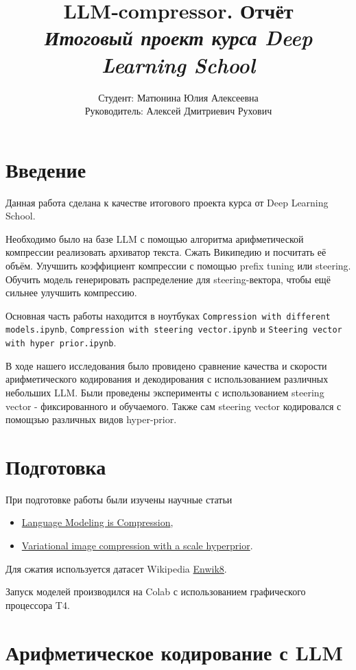 \documentclass[a4paper,11pt]{article}
\title{%
  LLM‑compressor. Отчёт\\[0.5ex]
  {\large\itshape Итоговый проект курса Deep Learning School}%
}
\author{%
  Студент: Матюнина Юлия Алексеевна\\
  Руководитель: Алексей Дмитриевич Рухович%
}
\date{}
\begin{document}
\maketitle

\section*{Введение}

Данная работа сделана к качестве итогового проекта курса от Deep Learning School.

Необходимо было на базе LLM с помощью алгоритма арифметической компрессии реализовать архиватор текста. Сжать Википедию и посчитать её объём. Улучшить коэффициент компрессии с помощью prefix tuning или steering. Обучить модель генерировать распределение для steering-вектора, чтобы ещё сильнее улучшить компрессию.

Основная часть работы находится в ноутбуках \texttt{Compression with different models.ipynb}, \texttt{Compression with steering vector.ipynb} и \texttt{Steering vector with hyper prior.ipynb}.

В ходе нашего исследования было провидено сравнение качества и скорости арифметического кодирования и декодирования с использованием различных небольших LLM. Были проведены эксперименты с использованием steering vector - фиксированного и обучаемого.
Также сам steering vector кодировался с помощзью различных видов hyper-prior.

\section*{Подготовка}

При подготовке работы были изучены научные статьи
\begin{itemize}
  \item \href{https://arxiv.org/pdf/2309.10668}{Language Modeling is Compression},
  \item \href{https://arxiv.org/pdf/1802.01436}{Variational image compression with a scale hyperprior}.
\end{itemize}
Для сжатия используется датасет Wikipedia
\href{https://www.kaggle.com/datasets/nightfury1103/enwik8}{Enwik8}.

Запуск моделей производился на Colab с использованием графического процессора T4.

\section{Арифметическое кодирование с LLM}
\end{document}
